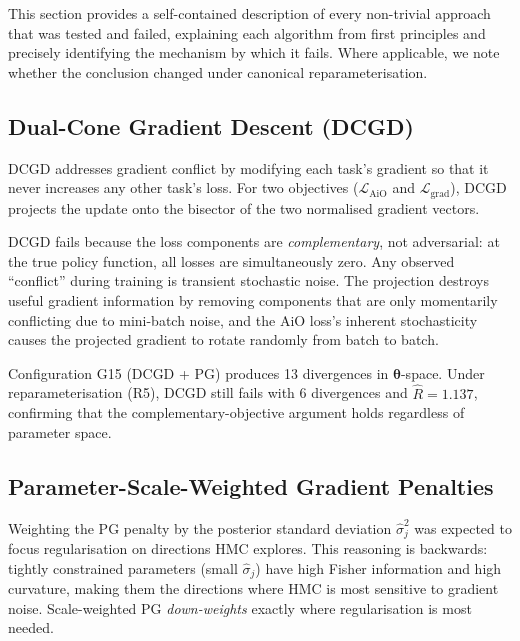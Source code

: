 \documentclass[11pt,a4paper]{article}
\theoremstyle{definition}
\newcommand{\btheta}{\boldsymbol{\theta}}
\begin{document}
	This section provides a self-contained description of every non-trivial approach that was tested and failed, explaining each algorithm from first principles and precisely identifying the mechanism by which it fails.
	Where applicable, we note whether the conclusion changed under canonical reparameterisation.
	
	\subsection{Dual-Cone Gradient Descent (DCGD)}
	\label{sec:dcgd_alg}
	
	DCGD \citep{dcgd_ref} addresses gradient conflict by modifying each task's gradient so that it never increases any other task's loss.
	For two objectives ($\mathcal{L}_{\mathrm{AiO}}$ and $\mathcal{L}_{\mathrm{grad}}$), DCGD projects the update onto the bisector of the two normalised gradient vectors.
	
	DCGD fails because the loss components are \emph{complementary}, not adversarial: at the true policy function, all losses are simultaneously zero.
	Any observed ``conflict'' during training is transient stochastic noise.
	The projection destroys useful gradient information by removing components that are only momentarily conflicting due to mini-batch noise, and the AiO loss's inherent stochasticity causes the projected gradient to rotate randomly from batch to batch.
	
	Configuration G15 (DCGD + PG) produces 13 divergences in $\btheta$-space.
	Under reparameterisation (R5), DCGD still fails with 6 divergences and $\hat{R} = 1.137$, confirming that the complementary-objective argument holds regardless of parameter space.
	
	\subsection{Parameter-Scale-Weighted Gradient Penalties}
	\label{sec:scale_weight}
	
	Weighting the PG penalty by the posterior standard deviation $\hat{\sigma}_j^2$ was expected to focus regularisation on directions HMC explores.
	This reasoning is backwards: tightly constrained parameters (small $\hat{\sigma}_j$) have high Fisher information and high curvature, making them the directions where HMC is most sensitive to gradient noise.
	Scale-weighted PG \emph{down-weights} exactly where regularisation is most needed.
	
\end{document}

